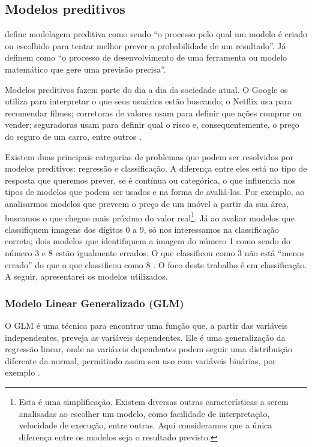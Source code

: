 \documentclass[a4paper,titlepage]{ppgi}\usepackage[]{graphicx}\usepackage[]{color}
\begin{document}
\subsection{Modelos preditivos}

 define modelagem preditiva como sendo ``o processo
pelo qual um modelo é criado ou escolhido para tentar melhor prever a
probabilidade de um resultado''. Já  definem como ``o
processo de desenvolvimento de uma ferramenta ou modelo matemático que gere uma
previsão precisa''.

Modelos preditivos fazem parte do dia a dia da sociedade atual. O Google os
utiliza para interpretar o que seus usuários estão buscando; o Netflix usa para
recomendar filmes; corretoras de valores usam para definir que ações comprar ou
vender; seguradoras usam para definir qual o risco e, consequentemente, o preço
do seguro de um carro, entre outros \cite{Levy2010}.

Existem duas principais categorias de problemas que podem ser resolvidos por
modelos preditivos: regressão e classificação. A diferença entre eles está no
tipo de resposta que queremos prever, se é contínua ou categórica, o que
influencia nos tipos de modelos que podem ser usados e na forma de avaliá-los.
Por exemplo, ao analisarmos modelos que preveem o preço de um imóvel a partir
da sua área, buscamos o que chegue mais próximo do valor real\footnote{Esta é
uma simplificação. Existem diversas outras características a serem analisadas
ao escolher um modelo, como facilidade de interpretação, velocidade de
execução, entre outras. Aqui consideramos que a única diferença entre os
modelos seja o resultado previsto.}. Já ao avaliar modelos que classifiquem
imagens dos dígitos 0 a 9, só nos interessamos na classificação correta; dois
modelos que identifiquem a imagem do número 1 como sendo do número 3 e 8 estão
igualmente errados. O que classificou como 3 não está ``menos errado'' do que o
que classificou como 8 \cite{Kuhn2013,Zumel2014}. O foco deste trabalho é em
classificação. A seguir, apresentarei os modelos utilizados.

\subsubsection{Modelo Linear Generalizado (GLM)}

O \gls{GLM} é uma técnica para encontrar uma função que, a partir das variáveis
independentes, preveja as variáveis dependentes. Ele é uma generalização da
regressão linear, onde as variáveis dependentes podem seguir uma
distribuição diferente da normal, permitindo assim seu uso com variáveis
binárias, por exemplo \cite{Kuhn2013}.
\end{document}
